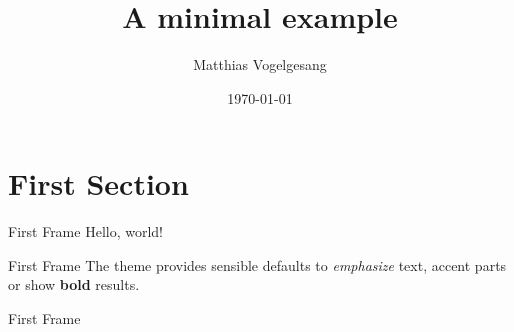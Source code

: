 \documentclass{beamer}
\title{A minimal example}
\date{\today}
\author{Matthias Vogelgesang}
\institute{Centre for Modern Beamer Themes}
\begin{document}
\maketitle

\section{First Section}

\begin{frame}{First Frame}
Hello, world! \cite{Finlayson_Chung_Kohane_Beam_2018}
\end{frame}

\begin{frame}{First Frame}
The theme provides sensible defaults to
\emph{emphasize} text, \alert{accent} parts
or show \textbf{bold} results.
\end{frame}


\begin{frame}{First Frame}
    \printbibliography
\end{frame}
\end{document}
